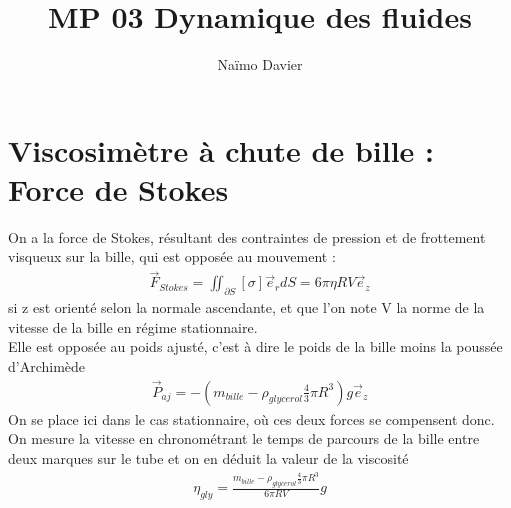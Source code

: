 \documentclass[12pt,prb,aps,epsf]{report}
\begin{document}
	
	\title{MP 03 Dynamique des fluides}
	\author{Naïmo Davier}
	
	\maketitle
	
	\tableofcontents
	
	\pagebreak

\section{Viscosimètre à chute de bille : Force de Stokes}
On a la force de Stokes, résultant des contraintes de pression et de frottement visqueux sur la bille, qui est opposée au mouvement :
\begin{eqnarray}
\vec{F}_{Stokes} = \iint_{\partial S}[\sigma]\vec{e}_rdS  = 6\pi\eta RV \vec{e}_z
\end{eqnarray}
si z est orienté selon la normale ascendante, et que l'on note V la norme de la vitesse de la bille en régime stationnaire.\\
Elle est opposée au poids ajusté, c'est à dire le poids de la bille moins la poussée d'Archimède
\begin{eqnarray}
\vec{P}_{aj} = -(m_{bille} - \rho_{glycerol} \frac{4}{3}\pi R^3)g\vec{e}_z
\end{eqnarray}
On se place ici dans le cas stationnaire, où ces deux forces se compensent donc. On mesure la vitesse en chronométrant le temps de parcours de la bille entre deux marques sur le tube et on en déduit la valeur de la viscosité
\begin{eqnarray}
\eta_{gly} = \frac{m_{bille} - \rho_{glycerol} \frac{4}{3}\pi R^3}{6\pi RV}g
\end{eqnarray}
\end{document}
